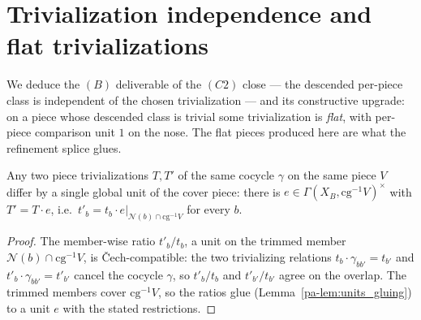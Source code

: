 \section{Trivialization independence and flat trivializations}
\label{pa-sec:effectivityOverlap}

We deduce the \((B)\) deliverable of the \((C2)\) close --- the descended per-piece class is
independent of the chosen trivialization --- and its constructive upgrade: on a piece whose descended
class is trivial some trivialization is \emph{flat}, with per-piece comparison unit \(1\) on the nose.
The flat pieces produced here are what the refinement splice glues.

\begin{theorem}
  \label{pa-thm:exists_ratio_unit}
  \leanok

  Any two piece trivializations \(T, T'\) of the same cocycle \(\gamma\) on the same piece \(V\)
  differ by a single global unit of the cover piece: there is \(e \in \Gamma(X_B, \mathrm{cg}^{-1}
  V)^{\times}\) with \(T' = T \cdot e\), i.e.\ \(t'_b = t_b \cdot e|_{\mathcal N(b) \cap \mathrm{cg}
  ^{-1}V}\) for every \(b\).
\end{theorem}
\begin{proof}
  \leanok
  The member-wise ratio \(t'_b / t_b\), a unit on the trimmed member \(\mathcal N(b) \cap \mathrm{cg}
  ^{-1}V\), is \v Cech-compatible: the two trivializing relations \(t_b \cdot \gamma_{b b'} =
  t_{b'}\) and \(t'_b \cdot \gamma_{b b'} = t'_{b'}\) cancel the cocycle \(\gamma\), so \(t'_b/t_b\)
  and \(t'_{b'}/t_{b'}\) agree on the overlap. The trimmed members cover \(\mathrm{cg}^{-1}V\), so the
  ratios glue (Lemma~\ref{pa-lem:units_gluing}) to a unit \(e\) with the stated restrictions.
\end{proof}

